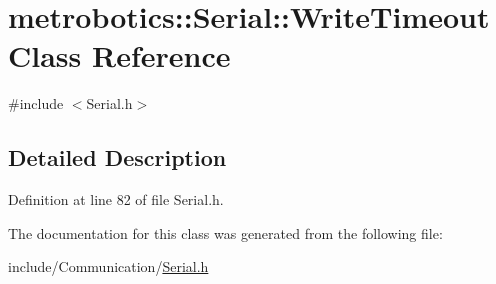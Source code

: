 \hypertarget{classmetrobotics_1_1Serial_1_1WriteTimeout}{\section{metrobotics\-:\-:\-Serial\-:\-:\-Write\-Timeout \-Class \-Reference}
\label{classmetrobotics_1_1Serial_1_1WriteTimeout}
}


{\ttfamily \#include $<$\-Serial.\-h$>$}



\subsection{\-Detailed \-Description}


\-Definition at line 82 of file \-Serial.\-h.



\-The documentation for this class was generated from the following file\-:\begin{DoxyCompactItemize}
\item 
include/\-Communication/\hyperlink{Serial_8h}{\-Serial.\-h}\end{DoxyCompactItemize}
